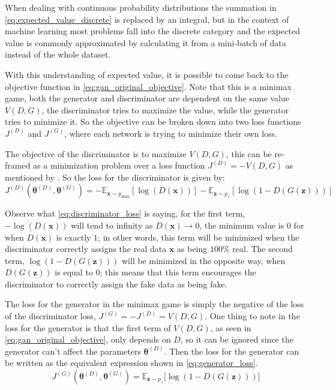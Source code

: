When dealing with continuous probability distributions the summation in \autoref{eq:expected_value_discrete} is replaced by an integral, but in the context of machine learning most problems fall into the discrete category and the expected value is commonly approximated by calculating it from a mini-batch of data instead of the whole dataset.

With this understanding of expected value, it is possible to come back to the objective function in \autoref{eq:gan_original_objective}. Note that this is a minimax game, both the generator and discriminator are dependent on the same value $V(D,G)$, the discriminator tries to maximize the value, while the generator tries to minimize it. So the objective can be broken down into two loss functions $J^{(D)}$ and $J^{(G)}$, where each network is trying to minimize their own loss.

The objective of the discriminator is to maximize $V(D,G)$, this can be re-framed as a minimization problem over a loss function $J^{(D)} = -V(D,G)$ as mentioned by \textcite{nipsGAN2017}. So the loss for the discriminator is given by:
\begin{equation} \label{eq:discriminator_loss}
    J^{(D)}(\bm{\theta}^{(D)},\bm{\theta}^{(G)}) = 
    -\mathbb{E}_{\bm{x}\sim p_{data}}\left\lbrack \log(D(\bm{x})) \right\rbrack
    -\mathbb{E}_{\bm{z}\sim p_{z}}\left\lbrack \log(1 - D(G(\bm{z}))) \right\rbrack
\end{equation}

Observe what \autoref{eq:discriminator_loss} is saying, for the first term, $-\log(D(\bm{x}))$ will tend to infinity as $D(\bm{x}) \to 0$, the minimum value is $0$ for when $D(\bm{x})$ is exactly $1$; in other words, this term will be minimized when the discriminator correctly assigns the real data $\bm{x}$ as being $100\%$ real. The second term, $\log(1 - D(G(\bm{z})))$ will be minimized in the opposite way, when $D(G(\bm{z}))$ is equal to $0$; this means that this term encourages the discriminator to correctly assign the fake data as being fake.

The loss for the generator in the minimax game is simply the negative of the loss of the discriminator loss, $J^{(G)} = -J^{(D)} = V(D,G)$. One thing to note in the loss for the generator is that the first term of $V(D,G)$, as seen in \autoref{eq:gan_original_objective}, only depends on $D$, so it can be ignored since the generator can't affect the parameters $\bm{\theta}^{(D)}$. Then the loss for the generator can be written as the equivalent expression shown in \autoref{eq:generator_loss}.
\begin{equation} \label{eq:generator_loss}
    J^{(G)}(\bm{\theta}^{(D)},\bm{\theta}^{(G)}) = 
    \mathbb{E}_{\bm{z}\sim p_{z}}\bigl\lbrack \log(1 - D(G(\bm{z}))) \bigr\rbrack
\end{equation}

